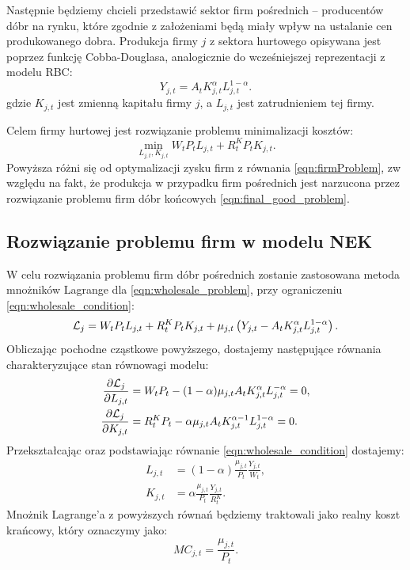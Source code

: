 Następnie będziemy chcieli przedstawić sektor firm pośrednich -- producentów dóbr na rynku, które zgodnie z założeniami  będą miały wpływ na ustalanie cen produkowanego dobra. Produkcja firmy $j$ z sektora hurtowego opisywana jest poprzez funkcję Cobba-Douglasa, analogicznie do wcześniejszej reprezentacji z modelu RBC:
\begin{equation}
    \label{eqn:wholesale_condition}
    Y_{j,t} = A_t K_{j,t}^\alpha L_{j,t}^{1-\alpha}.
\end{equation}
gdzie $K_{j,t}$ jest zmienną kapitału firmy $j$, a $L_{j,t}$ jest zatrudnieniem tej firmy. 

Celem firmy hurtowej jest rozwiązanie problemu minimalizacji kosztów:
\begin{equation}
    \label{eqn:wholesale_problem}
    \min_{L_{j,t},K_{j,t}} W_t P_t L_{j,t} + R^K_t P_t K_{j,t}.
\end{equation}
Powyższa różni się od optymalizacji zysku firm z równania \eqref{eqn:firmProblem}, zw względu na fakt, że produkcja w przypadku firm pośrednich jest narzucona przez rozwiązanie problemu firm dóbr końcowych \eqref{eqn:final_good_problem}.

\subsection{Rozwiązanie problemu firm w modelu NEK}
\label{sec:firms_nek_solve}

W celu rozwiązania problemu firm dóbr pośrednich zostanie zastosowana metoda mnożników Lagrange dla \eqref{eqn:wholesale_problem}, przy ograniczeniu \eqref{eqn:wholesale_condition}:
\begin{equation}
    \mathcal{L}_j = W_t P_t L_{j,t} + R^K_t P_t K_{j,t} + \mu_{j,t}\left( Y_{j,t} - A_t K_{j,t}^\alpha L_{j,t}^{1-\alpha} \right).
\end{equation}
Obliczając pochodne cząstkowe powyższego, dostajemy następujące równania charakteryzujące stan równowagi modelu:
\begin{align}
    \frac{\partial \mathcal{L}_j}{\partial L_{j,t}} &= W_t P_t - (1-\alpha) \mu_{j,t} A_t K_{j,t}^\alpha L_{j,t}^{-\alpha} = 0, \\
    \frac{\partial \mathcal{L}_j}{\partial K_{j,t}} &= R^K_t P_t - \alpha \mu_{j,t} A_t K_{j,t}^{\alpha - 1} L_{j,t}^{1-\alpha} = 0.
\end{align}
Przekształcając oraz podstawiając równanie \eqref{eqn:wholesale_condition} dostajemy:
\begin{align}
    L_{j,t} &= (1-\alpha) \frac{\mu_{j,t}}{P_t} \frac{Y_{j,t}}{W_t}, \label{eq:firmNEK:L}\\
    K_{j,t} &= \alpha \frac{\mu_{j,t}}{P_t} \frac{Y_{j,t}}{R^K_t}. \label{eq:firmNEK:K}
\end{align}
Mnożnik Lagrange'a z powyższych równań będziemy traktowali jako realny koszt krańcowy, który oznaczymy jako:
\begin{equation}
    MC_{j,t} = \frac{\mu_{j,t}}{P_t}.
\end{equation}

